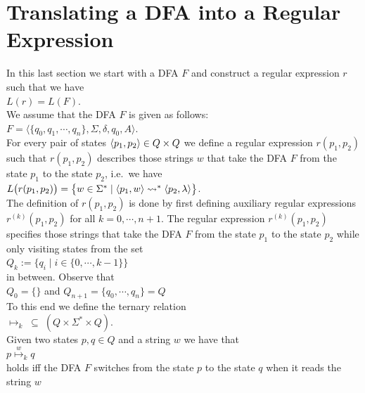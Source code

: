 \section{Translating a \textsc{DFA} into a Regular Expression}
In this last section we start with a \textsc{DFA} $F$ and construct a regular expression $r$
such that we have
\\[0.2cm]
\hspace*{1.3cm}
$L(r) = L(F)$. 
\\[0.2cm]
We assume that the \textsc{DFA} $F$ is given as follows:
\\[0.2cm]
\hspace*{1.3cm}
$F = \bigl\langle \{ q_0, q_1, \cdots, q_n \}, \Sigma, \delta, q_0, A \bigr\rangle$.
\\[0.2cm]
For every pair of states $\pair(p_1,p_2) \in Q \times Q$ we define a regular expression
$r(p_1, p_2)$ such that $r(p_1, p_2)$ describes those strings $w$ that take the \textsc{DFA} $F$ from the state
$p_1$ to the state $p_2$, i.e.~we have
\\[0.2cm]
\hspace*{1.3cm}
$L\bigl(r(p_1, p_2)\bigr) = 
  \bigl\{ w \in \Sigma^* \mid \pair(p_1,w) \leadsto^* \pair(p_2, \lambda) \bigr\}$.
\\[0.2cm]  
The definition of $r(p_1, p_2)$ is done by first defining auxiliary regular expressions 
$r^{(k)}(p_1, p_2)$ for all $k =0,\cdots,n+1$.   The regular expression $r^{(k)}(p_1, p_2)$ specifies those
strings that take the \textsc{DFA} $F$ from the state
$p_1$ to the state $p_2$ while only visiting states from the set
\\[0.2cm]
\hspace*{1.3cm}
$Q_k := \bigl\{ q_i \mid i \in \{0,\cdots,k-1 \}  \bigl\}$
\\[0.2cm]
in between.  Observe that
\\[0.2cm]
\hspace*{1.3cm}
$Q_0 = \{\}$ \quad and \quad $Q_{n+1} = \{q_0, \cdots, q_n \} = Q$
\\[0.2cm]
To this end we define the ternary relation
\\[0.2cm]
\hspace*{1.3cm}
$\mapsto_k \;\subseteq\; (Q \times \Sigma^* \times Q)$.
\\[0.2cm]
Given two states $p, q \in Q$ and a string $w$ we have that
\\[0.2cm]
\hspace*{1.3cm}
$p \stackrel{w}{\mapsto}_k q$
\\[0.2cm]
holds iff the \textsc{DFA} $F$ switches from the state $p$ to the state $q$ when it reads the string $w$
